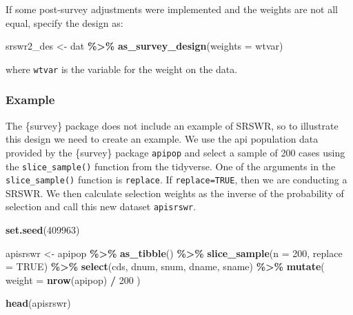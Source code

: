 \documentclass[
]{krantz}
\makeatletter
\newenvironment{Shaded}{\begin{snugshade}}{\end{snugshade}}
\newcommand{\AttributeTok}[1]{\textcolor[rgb]{0.27,0.27,0.27}{#1}}
\newcommand{\ConstantTok}[1]{\textcolor[rgb]{0.37,0.37,0.37}{#1}}
\newcommand{\DecValTok}[1]{\textcolor[rgb]{0.06,0.06,0.06}{#1}}
\newcommand{\FunctionTok}[1]{\textcolor[rgb]{0.27,0.27,0.27}{\textbf{#1}}}
\newcommand{\NormalTok}[1]{#1}
\newcommand{\OtherTok}[1]{\textcolor[rgb]{0.37,0.37,0.37}{#1}}
\newcommand{\SpecialCharTok}[1]{\textcolor[rgb]{0.43,0.43,0.43}{\textbf{#1}}}
\newenvironment{kframe}{%
\medskip{}
\setlength{\fboxsep}{.8em}
 \def\at@end@of@kframe{}%
 \ifinner\ifhmode%
  \def\at@end@of@kframe{\end{minipage}}%
  \begin{minipage}{\columnwidth}%
 \fi\fi%
 \def\FrameCommand##1{\hskip\@totalleftmargin \hskip-\fboxsep
 \colorbox{shadecolor}{##1}\hskip-\fboxsep
     \hskip-\linewidth \hskip-\@totalleftmargin \hskip\columnwidth}%
 \MakeFramed {\advance\hsize-\width
   \@totalleftmargin\z@ \linewidth\hsize
   \@setminipage}}%
 {\par\unskip\endMakeFramed%
 \at@end@of@kframe}
\renewenvironment{Shaded}{\begin{kframe}}{\end{kframe}}
\makeatother
\begin{document}
If some post-survey adjustments were implemented and the weights are not all equal, specify the design as:

\begin{Shaded}
\begin{Highlighting}[]
\NormalTok{srswr2\_des }\OtherTok{\textless{}{-}}\NormalTok{ dat }\SpecialCharTok{\%\textgreater{}\%}
 \FunctionTok{as\_survey\_design}\NormalTok{(}\AttributeTok{weights =}\NormalTok{ wtvar)}
\end{Highlighting}
\end{Shaded}

where \texttt{wtvar} is the variable for the weight on the data.

\hypertarget{example-3}{%
\subsubsection*{Example}\label{example-3}}


The \{survey\} package does not include an example of SRSWR, so to illustrate this design we need to create an example. We use the api population data provided by the \{survey\} package \texttt{apipop} and select a sample of 200 cases using the \texttt{slice\_sample()} function from the tidyverse. One of the arguments in the \texttt{slice\_sample()} function is \texttt{replace}. If \texttt{replace=TRUE}, then we are conducting a SRSWR. We then calculate selection weights as the inverse of the probability of selection and call this new dataset \texttt{apisrswr}.

\begin{Shaded}
\begin{Highlighting}[]
\FunctionTok{set.seed}\NormalTok{(}\DecValTok{409963}\NormalTok{)}

\NormalTok{apisrswr }\OtherTok{\textless{}{-}}\NormalTok{ apipop }\SpecialCharTok{\%\textgreater{}\%}
  \FunctionTok{as\_tibble}\NormalTok{() }\SpecialCharTok{\%\textgreater{}\%}
  \FunctionTok{slice\_sample}\NormalTok{(}\AttributeTok{n =} \DecValTok{200}\NormalTok{, }\AttributeTok{replace =} \ConstantTok{TRUE}\NormalTok{) }\SpecialCharTok{\%\textgreater{}\%}
  \FunctionTok{select}\NormalTok{(cds, dnum, snum, dname, sname) }\SpecialCharTok{\%\textgreater{}\%}
  \FunctionTok{mutate}\NormalTok{(}
    \AttributeTok{weight =} \FunctionTok{nrow}\NormalTok{(apipop) }\SpecialCharTok{/} \DecValTok{200}
\NormalTok{  )}

\FunctionTok{head}\NormalTok{(apisrswr)}
\end{Highlighting}
\end{Shaded}
\end{document}
